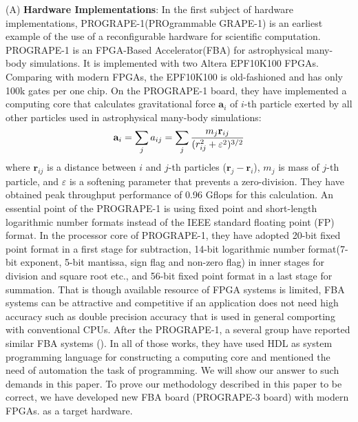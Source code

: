 \documentclass{llncs}
\begin{document}
(A) {\bf Hardware Implementations}:
In the first subject of hardware implementations,
PROGRAPE-1(PROgrammable GRAPE-1)\cite{HFKM00} is
an earliest example of the use of a reconfigurable hardware for
scientific computation.  PROGRAPE-1 is an FPGA-Based Accelerator(FBA)
for astrophysical many-body simulations. It is implemented with two
Altera EPF10K100 FPGAs. Comparing with modern FPGAs, the EPF10K100 is
old-fashioned and has only 100k gates per one chip.
On the PROGRAPE-1 board, they have implemented a computing core
that calculates gravitational force
$\mathbf{a}_i$ of $i$-th particle exerted by all other particles
used in astrophysical many-body simulations:
\begin{equation}
\mathbf{ a}_i = \sum_j a_{ij} = \sum_j {m_j \mathbf{ r}_{ij} \over (r_{ij}^2 + \varepsilon^2)^{3/2}}
\end{equation}
where $\mathbf{r}_{ij}$ is a distance between $i$ and $j$-th particles
($\mathbf{r}_j - \mathbf{r}_i $), 
$m_{j}$ is mass of $j$-th particle, and $\varepsilon$ is a softening parameter
that prevents a zero-division.
They have obtained peak throughput performance of 0.96 Gflops
for this calculation.
An essential point of the PROGRAPE-1 is using fixed point and short-length
logarithmic number formats instead of the IEEE standard floating point (FP) format. 
In the processor core of PROGRAPE-1, they have adopted 
20-bit fixed point format in a first stage for subtraction,
14-bit logarithmic number format(7-bit exponent,
5-bit mantissa, sign flag and non-zero flag)
in inner stages for division and square root etc., 
and 56-bit fixed point format in a last stage for summation.
That is though available resource of FPGA systems is limited,
FBA systems can be attractive and competitive if an application does
not need high accuracy such as double precision accuracy 
that is used in general comporting with conventional CPUs.
After the PROGRAPE-1, a several group have reported
similar FBA systems (\cite{LKM02}\cite{SS03}\cite{AKEDC04}).
In all of those works, they have used HDL as system programming language
for constructing a computing core and
mentioned the need of automation the task of programming.
We will show our answer to such demands in this paper.
To prove our methodology described in this paper to be correct,
we have developed new FBA board (PROGRAPE-3 board) with modern FPGAs.
as a target hardware.
\end{document}
